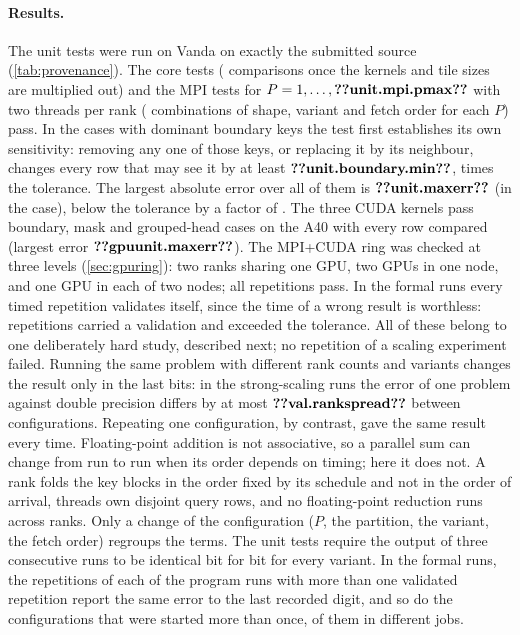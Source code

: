 \paragraph{Results.} The unit tests were run on Vanda on exactly the submitted
source (\cref{tab:provenance}). The core tests ( comparisons once
the kernels and tile sizes are multiplied out) and the MPI tests for
$P=1,\dots,\n{unit.mpi.pmax}$ with two threads per rank (
combinations of shape, variant and fetch order for each $P$) pass. In the cases
with dominant boundary keys the test first establishes its own sensitivity:
removing any one of those keys, or replacing it by its neighbour, changes every
row that may see it by at least $\n{unit.boundary.min}$, 
times the tolerance. The
largest absolute error over all of them is $\n{unit.maxerr}$ (in the
 case), below the tolerance by a factor of . The
three CUDA kernels pass  boundary, mask and grouped-head cases on
the A40 with every row compared (largest error $\n{gpuunit.maxerr}$). The MPI+CUDA
ring was checked at three levels (\cref{sec:gpuring}): two ranks sharing one GPU,
two GPUs in one node, and one GPU in each of two nodes; all repetitions pass. In the
formal runs every timed repetition validates itself, since the time of a wrong
result is worthless: \ValidatedReps{} repetitions carried a validation and
\ValidatedFailed{} exceeded the tolerance. All of these belong to one deliberately
hard study, described next; no repetition of a scaling experiment failed. Running
the same problem with different rank counts and variants changes the result only in
the last bits: in the strong-scaling runs the error of one problem against double
precision differs by at most $\n{val.rankspread}$ between configurations.
Repeating one configuration, by contrast, gave the same result every time. Floating-point
addition is not associative, so a parallel sum can change from run to run when
its order depends on timing; here it does not. A rank folds the key blocks in the
order fixed by its schedule and not in the order of arrival, threads own disjoint
query rows, and no floating-point reduction runs across ranks. Only a change of
the configuration ($P$, the partition, the variant, the fetch order) regroups the
terms. The unit tests
require the output of three consecutive runs to be identical bit for bit for
every variant. In the formal runs, the repetitions of each of the \RepeatedRuns{}
program runs with more than one validated repetition report the same error to the
last recorded digit, and so do the \RestartedConfigurations{} configurations that
were started more than once, \RestartedOtherJob{} of them in different jobs.

